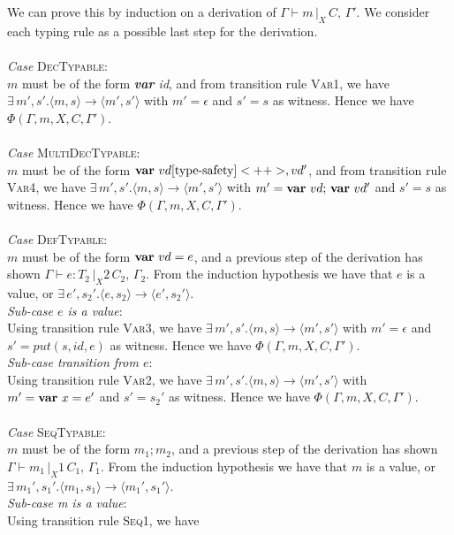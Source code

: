 \documentclass[a4paper, english]{article}
\begin{document}
	We can prove this by induction on a derivation of $\Gamma \vdash m \, |_X\,  C, \, \Gamma'$. We consider each typing rule as a possible last step for the derivation.
\\\\
	\textit{Case} \textsc{DecTypable}:\\
	$m$ must be of the form \textit{\textbf{var} id}, and from transition rule \textsc{Var1}, we have 
	$\exists \, m',s'. \langle m,s\rangle \rightarrow \langle m',s' \rangle$
	with $m'=\epsilon$ and $s'=s$ as witness. Hence we have 
	$\Phi(\Gamma, m, X, C, \Gamma') $.
\\ \\
	\textit{Case} \textsc{MultiDecTypable}:\\
	$m$ must be of the form $\textrm{\textbf{var} }vd \ref{type-safety}<++>, vd'$, and from transition rule \textsc{Var4}, we have 
	$\exists \, m',s'. \langle m,s\rangle \rightarrow \langle m',s' \rangle$ 
	with $m'= \textrm{\textbf{var} }vd\textrm{; \textbf{var} }vd'$ and $s'=s$ as witness. Hence we have 
	$\Phi(\Gamma, m, X, C, \Gamma') $.
\\ \\
	\textit{Case} \textsc{DefTypable}:\\
	$m$ must be of the form $\textrm{\textbf{var} }vd = e$, and a previous step of the derivation has shown 
	$\Gamma \vdash e : T_2 \, |_X2\,  C_2, \, \Gamma_2$.
	From the induction hypothesis we have that $e$ is a value, or 
	$\exists \, e',s_2'. \langle e,s_2\rangle \rightarrow \langle e',s_2' \rangle$. \\
	\textit{Sub-case $e$ is a value}: \\
	Using transition rule \textsc{Var3}, we have 
	$\exists \, m',s'. \langle m,s\rangle \rightarrow \langle m',s' \rangle$
	with $m'=\epsilon$ and $s'=put(s,id,e)$ as witness. Hence we have 
	$\Phi(\Gamma, m, X, C, \Gamma') $. \\
	\textit{Sub-case transition from $e$}: \\
	Using transition rule \textsc{Var2}, we have 
	$\exists \, m',s'. \langle m,s\rangle \rightarrow \langle m',s' \rangle$
	with $m'=\textrm{\textbf{var} }x=e'$ and $s'=s_2'$ as witness. Hence we have 
	$\Phi(\Gamma, m, X, C, \Gamma') $.
\\ \\
	\textit{Case} \textsc{SeqTypable}:\\
	$m$ must be of the form \textit{$m_1;m_2$}, and a previous step of the derivation has shown 
	$\Gamma \vdash m_1 \, |_X1\,  C_1, \, \Gamma_1$.
	From the induction hypothesis we have that $m$ is a value, or 
	$\exists \, m_1',s_1'. \langle m_1,s_1\rangle \rightarrow \langle m_1',s_1' \rangle$. \\
	\textit{Sub-case m is a value}: \\
	Using transition rule \textsc{Seq1}, we have 
	
\end{document}
